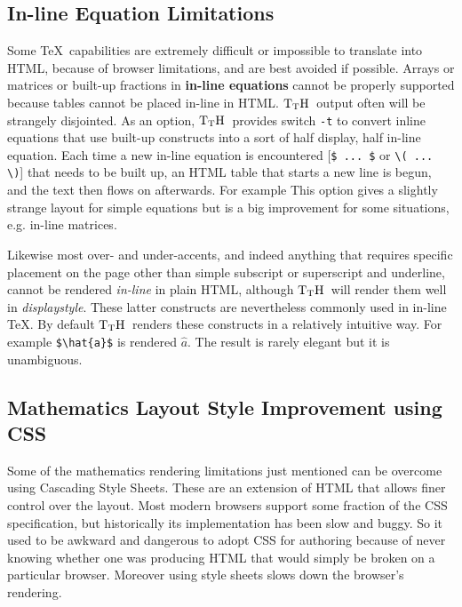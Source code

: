 \documentclass[12pt]{article}
\def\TtH{$\rm{}T_TH$}
\begin{document}
\subsection{In-line Equation Limitations}

 
 Some \TeX\ capabilities are
extremely difficult or impossible to translate into HTML, because of
browser limitations, and are best avoided if possible. Arrays or
matrices or built-up fractions in {\bf in-line equations} cannot be
properly supported because tables cannot be placed in-line in HTML.
\TtH\ output often will be strangely disjointed.
\label{inline}
 As an option, \TtH\ provides switch \verb+-t+ to convert inline
equations that use built-up constructs into a sort of half display,
half in-line equation. Each time a new in-line equation is encountered
[\verb+$ ... $+ or \verb+\( ... \)+] that needs to be built up, an
HTML table that starts a new line is begun, and the text then flows on
afterwards. For example
This option gives a slightly strange layout for simple equations
but is a big improvement for some situations, e.g. in-line matrices.
\fi

Likewise most over- and under-accents, and indeed anything that
requires specific placement on the page other than simple subscript or
superscript and underline, cannot be rendered \emph{in-line} in plain
HTML, although \TtH\ will render them well in
\emph{displaystyle}. These latter constructs are nevertheless commonly
used in in-line \TeX. By default \TtH\ renders these constructs in a
relatively intuitive way. For example \verb|$\hat{a}$| is rendered
$\hat{a}$. The result is rarely elegant but it is
unambiguous. 

\subsection{Mathematics Layout Style Improvement using CSS}\label{yswitch}

Some of the mathematics rendering limitations just mentioned can be
 overcome using Cascading Style Sheets. These are an extension of HTML
 that allows finer control over the layout. Most modern browsers
 support some fraction of the CSS specification, but historically its
 implementation has been slow and buggy. So it used to be awkward and
 dangerous to adopt CSS for authoring because of never knowing whether
 one was producing HTML that would simply be broken on a particular
 browser. Moreover using style sheets slows down the browser's
 rendering.
\end{document}
